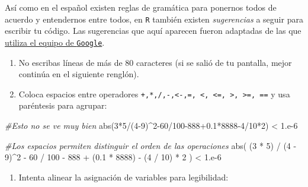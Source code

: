\documentclass[]{tufte-book}
\newenvironment{Shaded}{}{}
\newcommand{\CommentTok}[1]{\textcolor[rgb]{0.38,0.63,0.69}{\textit{#1}}}
\newcommand{\DecValTok}[1]{\textcolor[rgb]{0.25,0.63,0.44}{#1}}
\newcommand{\FloatTok}[1]{\textcolor[rgb]{0.25,0.63,0.44}{#1}}
\newcommand{\FunctionTok}[1]{\textcolor[rgb]{0.02,0.16,0.49}{#1}}
\newcommand{\NormalTok}[1]{#1}
\newcommand{\SpecialCharTok}[1]{\textcolor[rgb]{0.25,0.44,0.63}{#1}}
\providecommand{\tightlist}{%
  \setlength{\itemsep}{0pt}\setlength{\parskip}{0pt}}
\begin{document}
Así como en el español existen reglas de gramática para ponernos todos
de acuerdo y entendernos entre todos, en \texttt{R} también existen
\emph{sugerencias} a seguir para escribir tu código. Las sugerencias que
aquí aparecen fueron adaptadas de las que
\href{https://google.github.io/styleguide/Rguide.xml}{utiliza el equipo
de \texttt{Google}}.

\begin{enumerate}
\def\labelenumi{\arabic{enumi}.}
\item
  No escribas líneas de más de 80 caracteres (si se salió de tu
  pantalla, mejor continúa en el siguiente renglón).
\item
  Coloca espacios entre operadores
  \texttt{+,*,/,-,\textless{}-,=,\ \textless{},\ \textless{}=,\ \textgreater{},\ \textgreater{}=,\ ==}
  y usa paréntesis para agrupar:
\end{enumerate}

\begin{Shaded}
\begin{Highlighting}[]
\CommentTok{\#Esto no se ve muy bien}
\FunctionTok{abs}\NormalTok{(}\DecValTok{3}\SpecialCharTok{*}\DecValTok{5}\SpecialCharTok{/}\NormalTok{(}\DecValTok{4{-}9}\NormalTok{)}\SpecialCharTok{\^{}}\DecValTok{2{-}60}\SpecialCharTok{/}\DecValTok{100{-}888}\FloatTok{+0.1}\SpecialCharTok{*}\DecValTok{8888{-}4}\SpecialCharTok{/}\DecValTok{10}\SpecialCharTok{*}\DecValTok{2}\NormalTok{) }\SpecialCharTok{\textless{}} \DecValTok{1}\NormalTok{.e}\DecValTok{{-}6}

\CommentTok{\#Los espacios permiten distinguir el orden de las operaciones}
\FunctionTok{abs}\NormalTok{( (}\DecValTok{3} \SpecialCharTok{*} \DecValTok{5}\NormalTok{) }\SpecialCharTok{/}\NormalTok{ (}\DecValTok{4} \SpecialCharTok{{-}} \DecValTok{9}\NormalTok{)}\SpecialCharTok{\^{}}\DecValTok{2} \SpecialCharTok{{-}} \DecValTok{60} \SpecialCharTok{/} \DecValTok{100} \SpecialCharTok{{-}} \DecValTok{888} 
      \SpecialCharTok{+}\NormalTok{ (}\FloatTok{0.1} \SpecialCharTok{*} \DecValTok{8888}\NormalTok{) }\SpecialCharTok{{-}}\NormalTok{ (}\DecValTok{4} \SpecialCharTok{/} \DecValTok{10}\NormalTok{) }\SpecialCharTok{*} \DecValTok{2}\NormalTok{ ) }\SpecialCharTok{\textless{}} \DecValTok{1}\NormalTok{.e}\DecValTok{{-}6}
\end{Highlighting}
\end{Shaded}

\begin{enumerate}
\def\labelenumi{\arabic{enumi}.}
\setcounter{enumi}{2}
\tightlist
\item
  Intenta alinear la asignación de variables para legibilidad:
\end{enumerate}
\end{document}
